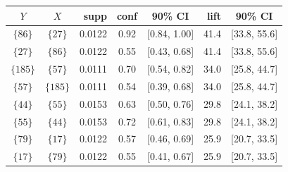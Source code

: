 \begin{tabular}{@{}ccrccrc@{}}
\toprule
$Y$ & $X$ & supp & conf & 90\% CI & lift & 90\% CI\\
\midrule
$\{86\}$ & $\{27\}$ & 0.0122 & 0.92 & [0.84, 1.00] & 41.4 & [33.8, 55.6] \\
$\{27\}$ & $\{86\}$ & 0.0122 & 0.55 & [0.43, 0.68] & 41.4 & [33.8, 55.6] \\
$\{185\}$ & $\{57\}$ & 0.0111 & 0.70 & [0.54, 0.82] & 34.0 & [25.8, 44.7] \\
$\{57\}$ & $\{185\}$ & 0.0111 & 0.54 & [0.39, 0.68] & 34.0 & [25.8, 44.7] \\
$\{44\}$ & $\{55\}$ & 0.0153 & 0.63 & [0.50, 0.76] & 29.8 & [24.1, 38.2] \\
$\{55\}$ & $\{44\}$ & 0.0153 & 0.72 & [0.61, 0.83] & 29.8 & [24.1, 38.2] \\
$\{79\}$ & $\{17\}$ & 0.0122 & 0.57 & [0.46, 0.69] & 25.9 & [20.7, 33.5] \\
$\{17\}$ & $\{79\}$ & 0.0122 & 0.55 & [0.41, 0.67] & 25.9 & [20.7, 33.5] \\
\bottomrule
\end{tabular}
